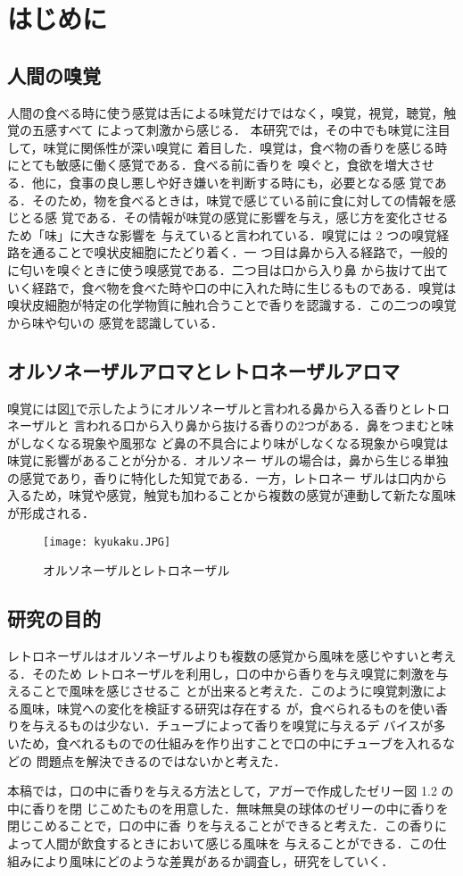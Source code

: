 \section{はじめに}
\subsection{人間の嗅覚}
\label{subsec:intro}
人間の食べる時に使う感覚は舌による味覚だけではなく，嗅覚，視覚，聴覚，触覚の五感すべて
によって刺激から感じる． 本研究では，その中でも味覚に注目して，味覚に関係性が深い嗅覚に
着目した．嗅覚は，食べ物の香りを感じる時にとても敏感に働く感覚である．食べる前に香りを
嗅ぐと，食欲を増大させる．他に，食事の良し悪しや好き嫌いを判断する時にも，必要となる感
覚である．そのため，物を食べるときは，味覚で感じている前に食に対しての情報を感じとる感
覚である．その情報が味覚の感覚に影響を与え，感じ方を変化させるため「味」に大きな影響を
与えていると言われている．嗅覚には 2 つの嗅覚経路を通ることで嗅状皮細胞にたどり着く．一
つ目は鼻から入る経路で，一般的に匂いを嗅ぐときに使う嗅感覚である．二つ目は口から入り鼻
から抜けて出ていく経路で，食べ物を食べた時や口の中に入れた時に生じるものである．嗅覚は
嗅状皮細胞が特定の化学物質に触れ合うことで香りを認識する．この二つの嗅覚から味や匂いの
感覚を認識している．


\subsection{オルソネーザルアロマとレトロネーザルアロマ}
嗅覚には図\ref{kyukaku}で示したようにオルソネーザルと言われる鼻から入る香りとレトロネーザルと
言われる口から入り鼻から抜ける香りの2つがある．鼻をつまむと味がしなくなる現象や風邪な
ど鼻の不具合により味がしなくなる現象から嗅覚は味覚に影響があることが分かる．オルソネー
ザルの場合は，鼻から生じる単独の感覚であり，香りに特化した知覚である．一方，レトロネー
ザルは口内から入るため，味覚や感覚，触覚も加わることから複数の感覚が連動して新たな風味
が形成される．


\begin{figure}[h]
    \centering
    \texttt{[image: kyukaku.JPG]}
    \caption{オルソネーザルとレトロネーザル}
    \label{kyukaku}
  \end{figure}


\subsection{研究の目的}
レトロネーザルはオルソネーザルよりも複数の感覚から風味を感じやすいと考える．そのため
レトロネーザルを利用し，口の中から香りを与え嗅覚に刺激を与えることで風味を感じさせるこ
とが出来ると考えた．このように嗅覚刺激による風味，味覚への変化を検証する研究は存在する
が，食べられるものを使い香りを与えるものは少ない．チューブによって香りを嗅覚に与えるデ
バイスが多いため，食べれるものでの仕組みを作り出すことで口の中にチューブを入れるなどの
問題点を解決できるのではないかと考えた．


本稿では，口の中に香りを与える方法として，アガーで作成したゼリー図 1.2 の中に香りを閉
じこめたものを用意した．無味無臭の球体のゼリーの中に香りを閉じこめることで，口の中に香
りを与えることができると考えた．この香りによって人間が飲食するときにおいて感じる風味を
与えることができる．この仕組みにより風味にどのような差異があるか調査し，研究をしていく．